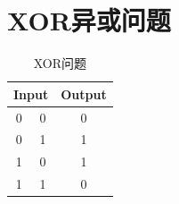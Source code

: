 \newpage
\section{XOR异或问题}
\begin{table}[htbp]
  \centering
  \caption{XOR问题}
    \begin{tabular}{ccc}
    \toprule
    \multicolumn{2}{c}{\textbf{Input}} & \textbf{Output} \\
    \midrule
    0     & 0     & 0 \\

    \rowcolor[rgb]{0.973, 0.973, 0.973} 0     & 1     & 1 \\

    1     & 0     & 1 \\

    \rowcolor[rgb]{0.973, 0.973, 0.973} 1     & 1     & 0 \\
    \bottomrule
    \end{tabular}%
  \label{XOR}%
\end{table}%

